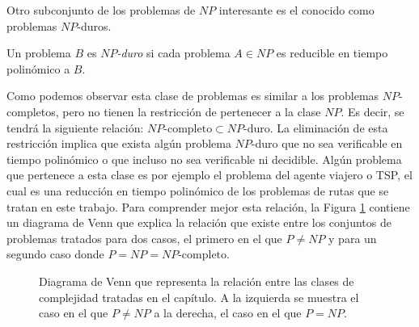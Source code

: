 Otro subconjunto de los problemas de $NP$ interesante es el conocido como problemas $NP$-duros.
\begin{definition}
    Un problema $B$ es $NP$\textit{-duro} si cada problema $A\in NP$ es reducible en tiempo polinómico a $B$.
\end{definition}

Como podemos observar esta clase de problemas es similar a los problemas $NP$-completos, pero no tienen la restricción de pertenecer a la clase $NP$. Es decir, se tendrá la siguiente relación: $NP\text{-completo}\subset NP\text{-duro}$. La eliminación de esta restricción implica que exista algún problema $NP$-duro que no sea verificable en tiempo polinómico o que incluso no sea verificable ni decidible. Algún problema que pertenece a esta clase es por ejemplo el problema del agente viajero o TSP, el cual es una reducción en tiempo polinómico de los problemas de rutas que se tratan en este trabajo. Para comprender mejor esta relación, la Figura \ref{fig:venncc} contiene un diagrama de Venn que explica la relación que existe entre los conjuntos de problemas tratados para dos casos, el primero en el que $P\neq NP$ y para un segundo caso donde $P=NP=NP\text{-completo}$.
\begin{figure}[H]
    \centering
    \caption{Diagrama de Venn que representa la relación entre las clases de complejidad tratadas en el capítulo. A la izquierda se muestra el caso en el que $P\neq NP$ a la derecha, el caso en el que $P=NP$.}
    \label{fig:venncc}
\end{figure}